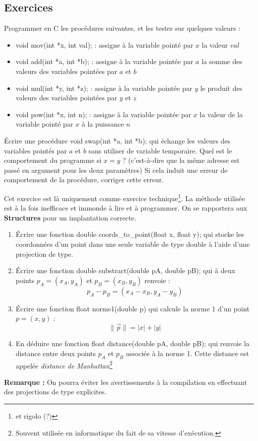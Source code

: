 \documentclass[../../../main.tex]{subfiles}
\begin{document}
\subsection{Exercices}
 Programmer en C les procédures suivantes, et les tester sur quelques valeurs :
\begin{itemize}
	\item \textsf{void mov(int *x, int val);} : assigne à la variable pointé par $x$ la valeur $val$
	\item \textsf{void add(int *a, int *b);} : assigne à la variable pointée par $a$ la somme des valeurs des variables pointées par $a$ et $b$
	\item \textsf{void mul(int *y, int *z);} : assigne à la variable pointée par $y$ le produit des valeurs des variables pointées par $y$ et $z$
	\item \textsf{void pow(int *x, int n);} : assigne à la variable pointée par $x$ la valeur de la variable pointé par $x$ à la puissance $n$
\end{itemize}
 Écrire une procédure \textsf{void swap(int *a, int *b);} qui échange les valeurs des variables pointés par $a$ et $b$ sans utiliser de variable temporaire. Quel est le comportement du programme si $x = y$ ? (c'est-à-dire que la même adresse est passé en argument pour les deux paramètres) \newline
Si cela induit une erreur de comportement de la procédure, corriger cette erreur.
 
 Cet exercice est là uniquement comme exercice technique\footnote{et rigolo (?)}. La méthode utilisée est à la fois inefficace et immonde à lire et à programmer. On se rapportera aux \textbf{Structures} pour un implantation correcte.
\begin{enumerate}
	\item Écrire une fonction \textsf{double coords\_to\_point(float x, float y);} qui stocke les coordonnées d'un point dans une seule variable de type \textsf{double} à l'aide d'une projection de type.
	\item Écrire une fonction \textsf{double substract(double pA, double pB);} qui à deux points $p_{A} = (x_{A}, y_{A})$ et $p_{B} = (x_{B}, y_{B})$ renvoie : $$p_{A} - p_{B} = (x_{A} - x_{B}, y_{A} - y_{B})$$
	\item Écrire une fonction \textsf{float norme1(double p)} qui calcule la norme 1 d'un point $p = (x, y)$ :
	$$\lVert{\vec{p}}\rVert = |x| + |y|$$
	\item En déduire une fonction \textsf{float distance(double pA, double pB);} qui renvoie la distance entre deux points $p_{A}$ et $p_{B}$ associée à la norme 1. Cette distance est appelée \textit{distance de Manhattan}\footnote{Souvent utilisée en informatique du fait de sa vitesse d'exécution.}
\end{enumerate}
\textbf{Remarque : }On pourra éviter les avertissements à la compilation en effectuant des projections de type explicites.
\end{document}
